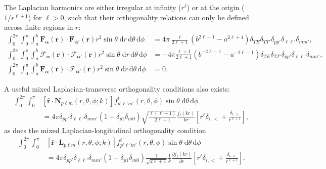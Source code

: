  The Laplacian harmonics are either irregular at infinity ($r^\ell$) or at the origin ($1/r^{\ell + 1}$) for $\ell > 0$, such that their orthogonality relations can only be defined across finite regions in $r$:
\begin{equation}\label{eq:laplacianHarmonicOrthogonality}
\begin{split}
\int_0^{2\pi}\int_0^\pi\int_a^b\mathbf{F}_{\bm{\alpha}}(\mathbf{r})\cdot\mathbf{F}_{\bm{\alpha}'}(\mathbf{r})r^2\sin\theta\;\mathrm{d}r\,\mathrm{d}\theta\,\mathrm{d}\phi &= 4\pi\frac{\ell}{2\ell + 1}\left(b^{2\ell + 1} - a^{2\ell + 1}\right)\delta_{T\!E}\delta_{TT'}\delta_{pp'}\delta_{\ell\ell'}\delta_{mm'},\\
\int_0^{2\pi}\int_0^\pi\int_a^b\bm{\mathcal{F}}_{\bm{\alpha}}(\mathbf{r})\cdot\bm{\mathcal{F}}_{\bm{\alpha}'}(\mathbf{r})r^2\sin\theta\;\mathrm{d}r\,\mathrm{d}\theta\,\mathrm{d}\phi &= -4\pi\frac{\ell + 1}{2\ell + 1}\left(b^{-2\ell - 1} - a^{-2\ell - 1}\right)\delta_{TE}\delta_{TT'}\delta_{pp'}\delta_{\ell\ell'}\delta_{mm'},\\
\int_0^{2\pi}\int_0^\pi\int_a^b\mathbf{F}_{\bm{\alpha}}(\mathbf{r})\cdot\bm{\mathcal{F}}_{\bm{\alpha}'}(\mathbf{r})r^2\sin\theta\;\mathrm{d}r\,\mathrm{d}\theta\,\mathrm{d}\phi &= 0.
\end{split}
\end{equation}

A useful mixed Laplacian-transverse orthogonality conditions also exists:
\begin{equation}\label{eq:angularMixedOrthogonalityNf}
\begin{split}
\int_0^{2\pi}\int_0^\pi&\left[\hat{\mathbf{r}}\cdot\mathbf{N}_{p\ell m}(r,\theta,\phi;k)\right]f_{p'\ell'm'}^i(r,\theta,\phi)\sin\theta\;\mathrm{d}\theta\,\mathrm{d}\phi\\
&= 4\pi\delta_{pp'}\delta_{\ell\ell'}\delta_{mm'}(1 - \delta_{p1}\delta_{m0})\sqrt{\frac{\ell(\ell + 1)}{2\ell + 1}}\frac{j_\ell(kr)}{kr}\left[r^\ell\delta_{i,<} + \frac{\delta_{i,>}}{r^{\ell + 1}}\right],
\end{split}
\end{equation}
as does the mixed Laplacian-longitudinal orthogonality condition
\begin{equation}\label{eq:angularMixedOrthogonalityLf}
\begin{split}
\int_0^{2\pi}\int_0^\pi&\left[\hat{\mathbf{r}}\cdot\mathbf{L}_{p\ell m}(r,\theta,\phi;k)\right]f_{p'\ell'm'}^i(r,\theta,\phi)\sin\theta\;\mathrm{d}\theta\,\mathrm{d}\phi\\
&= 4\pi\delta_{pp'}\delta_{\ell\ell'}\delta_{mm'}(1 - \delta_{p1}\delta_{m0})\frac{1}{\sqrt{2\ell + 1}}\frac{1}{k}\frac{\partial j_\ell(kr)}{\partial r}\left[r^\ell\delta_{i,<} + \frac{\delta_{i,>}}{r^{\ell + 1}}\right].
\end{split}
\end{equation}

